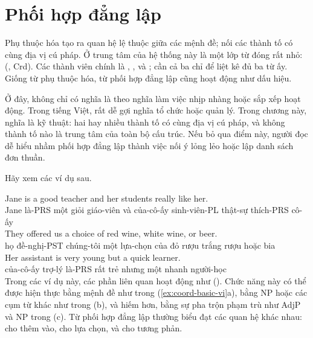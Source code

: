 \section{Phối hợp đẳng lập}\label{sec:coordination-vi}

Phụ thuộc hóa tạo ra quan hệ lệ thuộc giữa các mệnh đề;  nối các thành tố có cùng địa vị cú pháp. Ở trung tâm của hệ thống này là một lớp từ đóng rất nhỏ:  (, Crd). Các thành viên chính là , , và ; cần cả ba chỉ để liệt kê đủ ba từ ấy. Giống từ phụ thuộc hóa, từ phối hợp đẳng lập cũng hoạt động như dấu hiệu.

Ở đây,  không chỉ có nghĩa là  theo nghĩa làm việc nhịp nhàng hoặc sắp xếp hoạt động. Trong tiếng Việt,  rất dễ gợi nghĩa tổ chức hoặc quản lý. Trong chương này, nghĩa là kỹ thuật: hai hay nhiều thành tố có cùng địa vị cú pháp, và không thành tố nào là trung tâm của toàn bộ cấu trúc. Nếu bỏ qua điểm này, người đọc dễ hiểu nhầm phối hợp đẳng lập thành việc nối ý lỏng lẻo hoặc lập danh sách đơn thuần.

Hãy xem các ví dụ sau.

\ea \label{ex:coord-basic-vi}
    \ea \gll {\ob}Jane is a good teacher{\cb} {\ob}and her students really like her{\cb}.\\
        Jane là-PRS một giỏi giáo-viên và của-cô-ấy sinh-viên-PL thật-sự thích-PRS cô-ấy\\
    \glt {}
    \ex \gll They offered us a choice of {\ob}red wine{\cb}, {\ob}white wine{\cb}, {\ob}or beer{\cb}.\\
        họ đề-nghị-PST chúng-tôi một lựa-chọn của đỏ rượu trắng rượu hoặc bia\\
    \glt {}
    \ex \gll Her assistant is {\ob}very young{\cb} {\ob}but a quick learner{\cb}.\\
        của-cô-ấy trợ-lý là-PRS rất trẻ nhưng một nhanh người-học\\
    \glt {}
    \z
\z
Trong các ví dụ này, các phần liên quan hoạt động như  (). Chức năng này có thể được hiện thực bằng mệnh đề như trong (\ref{ex:coord-basic-vi}a), bằng NP hoặc các cụm từ khác như trong (b), và hiếm hơn, bằng sự pha trộn phạm trù như AdjP và NP trong (c). Từ phối hợp đẳng lập thường biểu đạt các quan hệ khác nhau:  cho thêm vào,  cho lựa chọn, và  cho tương phản.

